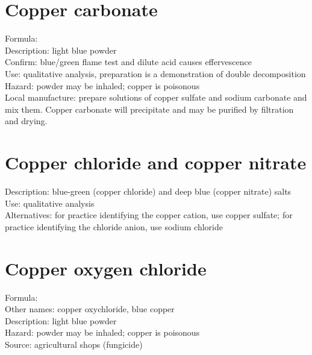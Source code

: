 \section{Copper carbonate}
\label{sec:}
Formula: \\
Description: light blue powder\\
Confirm: blue/green flame test and dilute acid causes effervescence\\
Use: qualitative analysis, 
preparation is a demonstration of double decomposition\\
Hazard: powder may be inhaled; 
copper is poisonous\\
Local manufacture: prepare solutions of copper sulfate 
and sodium carbonate and mix them. 
Copper carbonate will precipitate 
and may be purified by filtration and drying.

\section{Copper chloride and copper nitrate}
\label{sec:}
Description: blue-green (copper chloride) 
and deep blue (copper nitrate) salts \\
Use: qualitative analysis\\
Alternatives: for practice identifying the copper cation, 
use copper sulfate; 
for practice identifying the chloride anion, 
use sodium chloride

\section{Copper oxygen chloride}
\label{sec:}
Formula: \\
Other names: copper oxychloride, 
blue copper\\
Description: light blue powder\\
Hazard: powder may be inhaled; 
copper is poisonous\\
Source: agricultural shops (fungicide)

